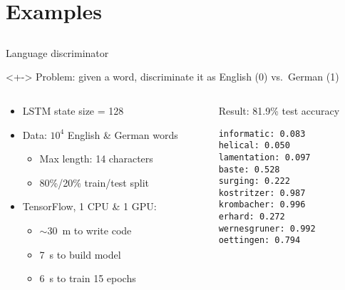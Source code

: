 \section{Examples}
\subsection{}

\begin{frame}[fragile]{Language discriminator}
    \begin{block}{}<+->
        Problem: given a word, discriminate it as English (0) vs.\ German (1)
    \end{block}

    \centering
    

    \begin{columns}
        \begin{column}{0.61\textwidth}
            \vspace{-5mm}
            \begin{itemize}
                \item LSTM state size = 128
                \pause
                \item Data: $10^4$ English \& German words
                \begin{itemize}
                    \item Max length: 14 characters
                    \item 80\%/20\% train/test split
                \end{itemize}
                \pause
                \item TensorFlow, 1 CPU \& 1 GPU:
                \begin{itemize}
                    \item $\sim$30~m to write code
                    \item 7~s to build model
                    \item 6~s to train 15 epochs
                \end{itemize}
            \end{itemize}
        \end{column}
        \begin{column}{0.39\textwidth}
            \pause
            Result: 81.9\% test accuracy
            \vspace{-17pt}
            \footnotesize
\begin{verbatim}
informatic: 0.083
helical: 0.050
lamentation: 0.097
baste: 0.528
surging: 0.222
kostritzer: 0.987
krombacher: 0.996
erhard: 0.272
wernesgruner: 0.992
oettingen: 0.794
\end{verbatim}
        \end{column}
    \end{columns}
\end{frame}

